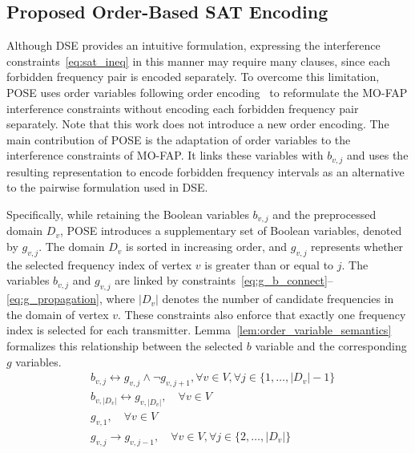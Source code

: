 \documentclass[letterpaper,journal]{IEEEtran}
\begin{document}
\subsection{Proposed Order-Based SAT Encoding}
\label{subsec:order_encoding}
Although DSE provides an intuitive formulation, expressing the interference constraints~\eqref{eq:sat_ineq} in this manner may require many clauses, since each forbidden frequency pair is encoded separately.
To overcome this limitation, POSE uses order variables following order encoding~\cite{Crawford1994Scheduling,Tamura2009OrderEncoding,Petke2011Order_encoding,Abio2014LinearSAT} to reformulate the MO-FAP interference constraints without encoding each forbidden frequency pair separately.
Note that this work does not introduce a new order encoding.
The main contribution of POSE is the adaptation of order variables to the interference constraints of MO-FAP. It links these variables with $b_{v,j}$ and uses the resulting representation to encode forbidden frequency intervals as an alternative to the pairwise formulation used in DSE.

Specifically, while retaining the Boolean variables $b_{v,j}$ and the preprocessed domain $D_v$, POSE introduces a supplementary set of Boolean variables, denoted by $g_{v,j}$.
The domain $D_v$ is sorted in increasing order, and $g_{v,j}$ represents whether the selected frequency index of vertex $v$ is greater than or equal to $j$.
The variables $b_{v,j}$ and $g_{v,j}$ are linked by constraints~\eqref{eq:g_b_connect}--\eqref{eq:g_propagation}, where $|D_v|$ denotes the number of candidate frequencies in the domain of vertex $v$.
These constraints also enforce that exactly one frequency index is selected for each transmitter.
Lemma~\ref{lem:order_variable_semantics} formalizes this relationship between the selected $b$ variable and the corresponding $g$ variables.
\begin{align}
    & b_{v,j} \leftrightarrow g_{v,j} \wedge \neg g_{v,j+1}, \forall v \in V, \forall j \in \{1, \dots, |D_v|-1\} \label{eq:g_b_connect} \\
    & b_{v,|D_v|} \leftrightarrow g_{v,|D_v|}, \quad \forall v \in V \label{eq:g_right_bound} \\
    & g_{v,1}, \quad \forall v \in V \label{eq:g_left_bound} \\
    & g_{v,j} \rightarrow g_{v,j-1}, \quad \forall v \in V, \forall j \in \{2, \dots, |D_v|\} \label{eq:g_propagation}
\end{align}
\end{document}
